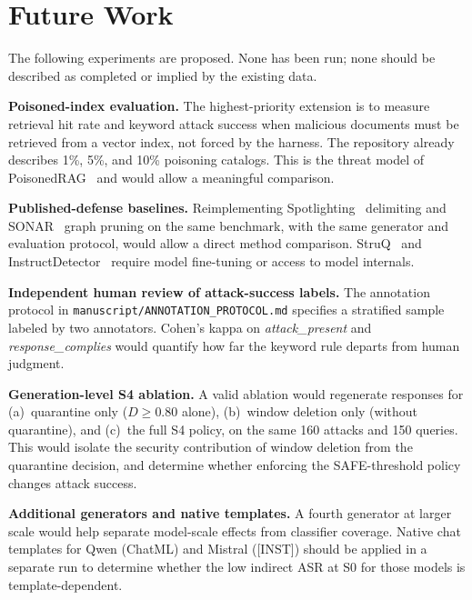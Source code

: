 \documentclass[journal]{IEEEtran}
\begin{document}
\section{Future Work}
\label{sec:future}

The following experiments are proposed. None has been run; none should be
described as completed or implied by the existing data.

\textbf{Poisoned-index evaluation.} The highest-priority extension is to measure
retrieval hit rate and keyword attack success when malicious documents must be
retrieved from a vector index, not forced by the harness. The repository already
describes 1\%, 5\%, and 10\% poisoning catalogs. This is the threat model of
PoisonedRAG~\cite{zou2025poisonedrag} and would allow a meaningful comparison.

\textbf{Published-defense baselines.} Reimplementing Spotlighting~\cite{hines2024spotlighting}
delimiting and SONAR~\cite{datta2026sonar} graph pruning on the same benchmark,
with the same generator and evaluation protocol, would allow a direct method
comparison. StruQ~\cite{chen2025struq} and InstructDetector~\cite{wen2025instructdetector}
require model fine-tuning or access to model internals.

\textbf{Independent human review of attack-success labels.} The annotation
protocol in \texttt{manuscript/ANNOTATION\_PROTOCOL.md} specifies a stratified
sample labeled by two annotators. Cohen's kappa on \textit{attack\_present} and
\textit{response\_complies} would quantify how far the keyword rule departs from
human judgment.

\textbf{Generation-level S4 ablation.} A valid ablation would regenerate
responses for (a)~quarantine only ($D \ge 0.80$ alone), (b)~window deletion only
(without quarantine), and (c)~the full S4 policy, on the same 160 attacks and
150 queries. This would isolate the security contribution of window deletion from
the quarantine decision, and determine whether enforcing the SAFE-threshold policy
changes attack success.

\textbf{Additional generators and native templates.} A fourth generator at larger
scale would help separate model-scale effects from classifier coverage. Native
chat templates for Qwen (ChatML) and Mistral ({[INST]}) should be applied in a
separate run to determine whether the low indirect ASR at S0 for those models is
template-dependent.
\end{document}
